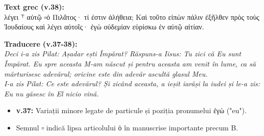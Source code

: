 \documentclass[11pt, a4paper]{article}
\newcommand{\textgreek}[1]{\foreignlanguage{greek}{#1}}
\begin{document}
\textbf{Text grec (v.38):} \\
\textgreek{λέγει ⸆ αὐτῷ ▫ὁ Πιλᾶτος· τί ἐστιν ἀλήθεια; Καὶ τοῦτο εἰπὼν πάλιν ἐξῆλθεν πρὸς τοὺς Ἰουδαίους καὶ λέγει αὐτοῖς· ἐγὼ οὐδεμίαν εὑρίσκω ἐν αὐτῷ αἰτίαν.}

\textbf{Traducere (v.37-38):} \\
\textit{Deci i-a zis Pilat: Așadar ești Împărat? Răspuns-a Iisus: Tu zici că Eu sunt Împărat. Eu spre aceasta M-am născut și pentru aceasta am venit în lume, ca să mărturisesc adevărul; oricine este din adevăr ascultă glasul Meu. \\
    I-a zis Pilat: Ce este adevărul? Și zicând aceasta, a ieșit iarăși la iudei și le-a zis: Eu nu găsesc în El nicio vină.}

\begin{itemize}
    \item \textbf{v.37:} Variații minore legate de particule și poziția pronumelui \textgreek{ἐγὼ} ("eu").
    \item Semnul \textgreek{▫} indică lipsa articolului \textgreek{ὁ} în manuscrise importante precum B.
\end{itemize}
\end{document}

